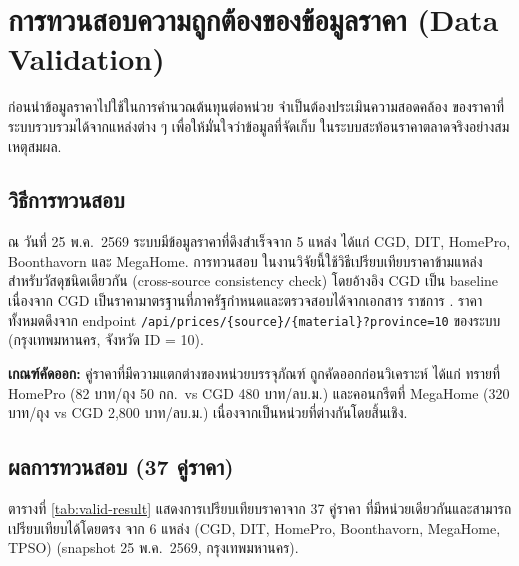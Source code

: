 \section{การทวนสอบความถูกต้องของข้อมูลราคา (Data Validation)}
\label{sec:validation}

ก่อนนำข้อมูลราคาไปใช้ในการคำนวณต้นทุนต่อหน่วย จำเป็นต้องประเมินความสอดคล้อง
ของราคาที่ระบบรวบรวมได้จากแหล่งต่าง ๆ เพื่อให้มั่นใจว่าข้อมูลที่จัดเก็บ
ในระบบสะท้อนราคาตลาดจริงอย่างสมเหตุสมผล.

\subsection{วิธีการทวนสอบ}

ณ วันที่ 25 พ.ค.\ 2569 ระบบมีข้อมูลราคาที่ดึงสำเร็จจาก 5 แหล่ง
ได้แก่ CGD, DIT, HomePro, Boonthavorn และ MegaHome. การทวนสอบ
ในงานวิจัยนี้ใช้วิธีเปรียบเทียบราคาข้ามแหล่งสำหรับวัสดุชนิดเดียวกัน
(cross-source consistency check) โดยอ้างอิง CGD เป็น baseline
เนื่องจาก CGD เป็นราคามาตรฐานที่ภาครัฐกำหนดและตรวจสอบได้จากเอกสาร
ราชการ \cite{cgd2569}. ราคาทั้งหมดดึงจาก endpoint
\texttt{/api/prices/\{source\}/\{material\}?province=10} ของระบบ
(กรุงเทพมหานคร, จังหวัด ID = 10).

\textbf{เกณฑ์คัดออก:} คู่ราคาที่มีความแตกต่างของหน่วยบรรจุภัณฑ์
ถูกคัดออกก่อนวิเคราะห์ ได้แก่ ทรายที่ HomePro (82 บาท/ถุง 50 กก.\ vs
CGD 480 บาท/ลบ.ม.) และคอนกรีตที่ MegaHome (320 บาท/ถุง vs CGD
2,800 บาท/ลบ.ม.) เนื่องจากเป็นหน่วยที่ต่างกันโดยสิ้นเชิง.

\subsection{ผลการทวนสอบ (37 คู่ราคา)}

ตารางที่ \ref{tab:valid-result} แสดงการเปรียบเทียบราคาจาก 37 คู่ราคา
ที่มีหน่วยเดียวกันและสามารถเปรียบเทียบได้โดยตรง จาก 6 แหล่ง
(CGD, DIT, HomePro, Boonthavorn, MegaHome, TPSO)
(snapshot 25 พ.ค.\ 2569, กรุงเทพมหานคร).

